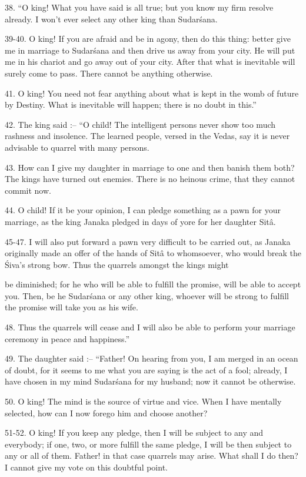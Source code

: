 38. ``O king! What you have said is all true; but you know my firm resolve already. I won't ever select any other king than Sudar\'sana.

39-40. O king! If you are afraid and be in agony, then do this thing: better give me in marriage to Sudar\'sana and then drive us away from your city. He will put me in his chariot and go away out of your city. After that what is inevitable will surely come to pass. There cannot be anything otherwise.

41. O king! You need not fear anything about what is kept in the womb of future by Destiny. What is inevitable will happen; there is no doubt in this.''

42. The king said :-- ``O child! The intelligent persons never show too much rashness and insolence. The learned people, versed in the Vedas, say it is never advisable to quarrel with many persons.

43. How can I give my daughter in marriage to one and then banish them both? The kings have turned out enemies. There is no heinous crime, that they cannot commit now.

44. O child! If it be your opinion, I can pledge something as a pawn for your marriage, as the king Janaka pledged in days of yore for her daughter Sit\^a.

45-47. I will also put forward a pawn very difficult to be carried out, as Janaka originally made an offer of the hands of Sit\^a to whomsoever, who would break the \'Siva's strong bow. Thus the quarrels amongst the kings might

be diminished; for he who will be able to fulfill the promise, will be able to accept you. Then, be he Sudar\'sana or any other king, whoever will be strong to fulfill the promise will take you as his wife.

48. Thus the quarrels will cease and I will also be able to perform your marriage ceremony in peace and happiness.''

49. The daughter said :-- ``Father! On hearing from you, I am merged in an ocean of doubt, for it seems to me what you are saying is the act of a fool; already, I have chosen in my mind Sudar\'sana for my husband; now it cannot be otherwise.

50. O king! The mind is the source of virtue and vice. When I have mentally selected, how can I now forego him and choose another?

51-52. O king! If you keep any pledge, then I will be subject to any and everybody; if one, two, or more fulfill the same pledge, I will be then subject to any or all of them. Father! in that case quarrels may arise. What shall I do then? I cannot give my vote on this doubtful point.

